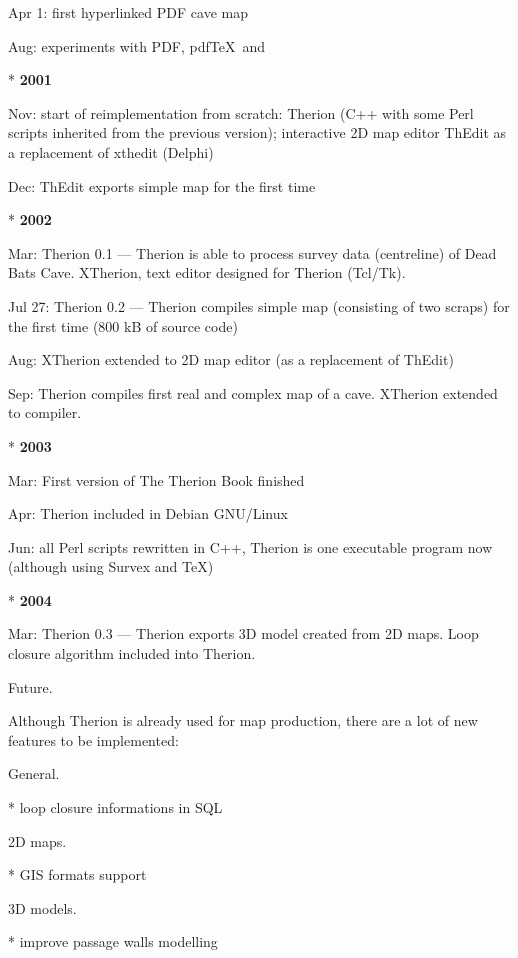   Apr 1: first hyperlinked PDF cave map 

  Aug: experiments with PDF, pdf\TeX\ and \MP

* {\bf 2001}

  Nov: start of reimplementation from scratch: 
       Therion (C++ with some Perl scripts inherited from the previous version); 
       interactive 2D map editor ThEdit as a replacement of xthedit (Delphi) 

  Dec: ThEdit exports simple map for the first time

* {\bf 2002}

  Mar: Therion 0.1 ---
       Therion is able to process survey data (centreline) of Dead Bats Cave.
       XTherion, text editor designed for Therion (Tcl/Tk).

  Jul 27: Therion 0.2 ---
       Therion compiles simple map (consisting of two scraps)
       for the first time (800 kB of source code)

  Aug: XTherion extended to 2D map editor (as a replacement of ThEdit)

  Sep: Therion compiles first real and complex map of a cave. XTherion
       extended to compiler.


* {\bf 2003}\nobreak

  Mar: First version of The Therion Book finished

  Apr: Therion included in Debian GNU/Linux

  Jun: all Perl scripts rewritten in C++, Therion is one executable program
       now (although using Survex and \TeX)
       

* {\bf 2004}\Nobreak

  Mar: Therion 0.3 --- Therion exports 3D model created from 2D maps.
  Loop closure algorithm included into Therion.
\endlist


\subchapter Future.

Although Therion is already used for map production, there are a lot of 
new features to be implemented:

\subsubchapter General.

\list
* loop closure informations in SQL
\endlist

\subsubchapter 2D maps.

\list
* GIS formats support
\endlist


\subsubchapter 3D models.

\list
* improve passage walls modelling
\endlist

\endinput
